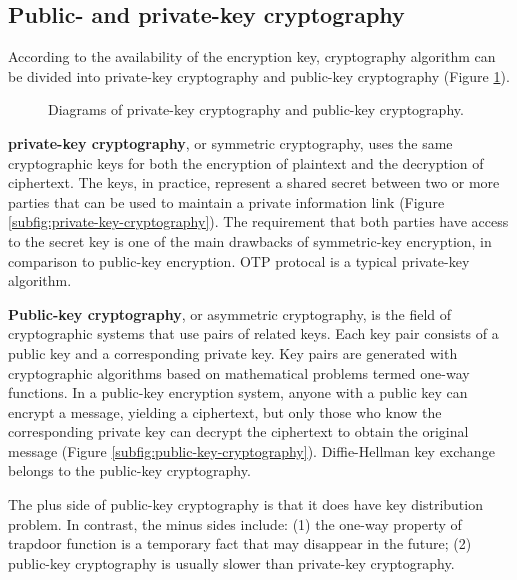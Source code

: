 \documentclass{easyclass}
\begin{document}
\subsection{Public- and private-key cryptography}
According to the availability of the encryption key, cryptography algorithm can be divided into private-key cryptography and public-key cryptography (Figure \ref{fig:public-private-key-cryptography}).

\begin{figure}[h]
	\centering
	\hspace{0.05\textwidth}
	\caption{Diagrams of private-key cryptography and public-key cryptography.}
	\label{fig:public-private-key-cryptography}
\end{figure}

\textbf{private-key cryptography}, or symmetric cryptography, uses the same cryptographic keys for both the encryption of plaintext and the decryption of ciphertext. The keys, in practice, represent a shared secret between two or more parties that can be used to maintain a private information link (Figure \ref{subfig:private-key-cryptography}). The requirement that both parties have access to the secret key is one of the main drawbacks of symmetric-key encryption, in comparison to public-key encryption. OTP protocal is a typical private-key algorithm.

\textbf{Public-key cryptography}, or asymmetric cryptography, is the field of cryptographic systems that use pairs of related keys. Each key pair consists of a public key and a corresponding private key. Key pairs are generated with cryptographic algorithms based on mathematical problems termed one-way functions. In a public-key encryption system, anyone with a public key can encrypt a message, yielding a ciphertext, but only those who know the corresponding private key can decrypt the ciphertext to obtain the original message (Figure \ref{subfig:public-key-cryptography}). Diffie-Hellman key exchange belongs to the public-key cryptography.

The plus side of public-key cryptography is that it does have key distribution problem. In contrast, the minus sides include: (1) the one-way property of trapdoor function is a temporary fact that may disappear in the future; (2) public-key cryptography is usually slower than private-key cryptography.
\end{document}
